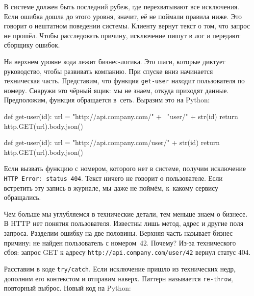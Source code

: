 В системе должен быть последний рубеж, где перехватывают все исключения. Если
ошибка дошла до этого уровня, значит, её не поймали правила ниже. Это говорит о
нештатном поведении системы. Клиенту вернут текст о том, что запрос не
прошёл. Чтобы расследовать причину, исключение пишут в лог и передают сборщику
ошибок.

На верхнем уровне кода лежит бизнес-логика. Это шаги, которые диктует
руководство, чтобы развивать компанию. При спуске вниз начинается техническая
часть. Представим, что функция \verb|get-user| находит пользователя по
номеру. Снаружи это чёрный ящик: мы не знаем, откуда приходят
данные. Предположим, функция обращается в~сеть. Выразим это на Python:

\ifx\devicetype\mobile

\begin{english}
  \begin{python}
def get-user(id):
  url = "http://api.company.com/" + \
        "user/" + str(id)
  return http.GET(url).body.json()
  \end{python}
\end{english}

\else

\begin{english}
  \begin{python}
def get-user(id):
  url = "http://api.company.com/user/" + str(id)
  return http.GET(url).body.json()
  \end{python}
\end{english}

\fi

Если вызвать функцию с номером, которого нет в системе, получим исключение
\verb|HTTP Error: status 404|. Текст ничего не говорит о пользователе. Если
встретить эту запись в журнале, мы даже не поймём, к~какому сервису обращались.

Чем больше мы углубляемся в технические детали, тем меньше знаем о бизнесе. В
HTTP нет понятия пользователя. Известны лишь метод, адрес и другие поля
запроса. Разделим ошибку на две половины. Верхняя часть называет бизнес-причину:
не найден пользователь с номером~42. Почему? Из-за технического сбоя: запрос GET
к адресу \verb|http://api.company.com/user/42| вернул статус 404.

Расставим в коде \verb|try/catch|. Если исключение пришло из технических недр,
дополним его контекстом и отправим наверх. Паттерн называется \verb|re-throw|,
повторный выброс. Новый код на Python:


